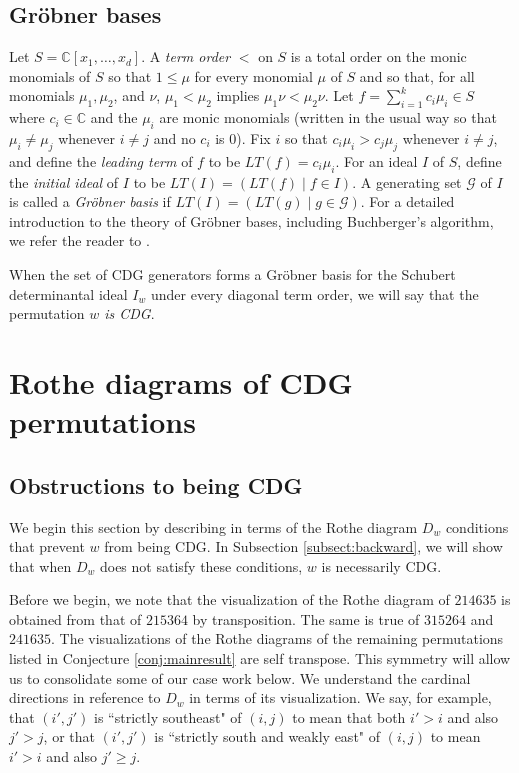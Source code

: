 \documentclass[ALCO,Unicode,published]{cedram}
\newcommand{\CC}{\mathbb{C}}
\begin{document}
\subsection{Gr\"obner bases}\label{subsect:Grobner}

Let $S=\mathbb{C}[x_1, \ldots, x_d]$.  A \emph{term order} $<$ on $S$ is a total order on the monic monomials of $S$ so that $1 \leq \mu$ for every monomial $\mu$ of $S$ and so that, for all monomials $\mu_1, \mu_2$, and $\nu$, $\mu_1<\mu_2$ implies $\mu_1 \nu < \mu_2 \nu$.  Let $f = \sum_{i=1}^k c_i \mu_i \in S$ where $c_i \in \CC$ and the $\mu_i$ are monic monomials (written in the usual way so that $\mu_i \neq \mu_j$ whenever $i \neq j$ and no $c_i$ is  $0$).  Fix $i$ so that $c_i \mu_i >c_j \mu_j$ whenever $i \neq j$, and define the \emph{leading term} of $f$ to be $LT(f)=c_i \mu_i$.  For an ideal $I$ of $S$, define the \emph{initial ideal} of $I$ to be $LT(I) = (LT(f) \mid f \in I)$.  A generating set $\mathcal{G}$ of $I$ is called a \emph{Gr\"obner basis} if $LT(I) = (LT(g) \mid g \in \mathcal{G})$.  For a detailed introduction to the theory of Gr\"obner bases, including Buchberger's algorithm, we refer the reader to \cite[Chapter 15]{Eis95}.

\begin{definition}
When the set of CDG generators forms a Gr\"obner basis for the Schubert determinantal ideal $I_w$ under every diagonal term order, we will say that the permutation \emph{$w$ is CDG}.  
\end{definition}

\section{Rothe diagrams of CDG permutations}\label{sect:backward}

\subsection{Obstructions to being CDG}

We begin this section by describing in terms of the Rothe diagram $D_w$ conditions that prevent $w$ from being CDG.  In Subsection \ref{subsect:backward}, we will show that when $D_w$ does not satisfy these conditions, $w$ is necessarily CDG.

Before we begin, we note that the visualization of the Rothe diagram of $214635$ is obtained from that of $215364$ by transposition.  The same is true of $315264$ and $241635$.  The visualizations of the Rothe diagrams of the remaining permutations listed in Conjecture \ref{conj:mainresult} are self transpose.   This symmetry will allow us to consolidate some of our case work below.  We understand the cardinal directions in reference to $D_w$ in terms of its visualization.  We say, for example, that $(i',j')$ is ``strictly southeast" of $(i,j)$ to mean that both $i'>i$ and also $j'>j$, or that $(i',j')$ is ``strictly south and weakly east" of $(i,j)$ to mean $i'>i$ and also $j' \geq j$.
\end{document}
